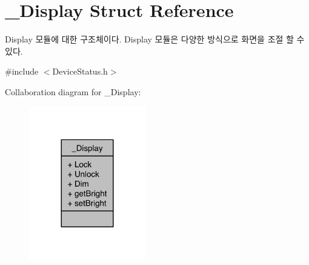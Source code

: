 \hypertarget{struct__Display}{\section{\-\_\-\-Display Struct Reference}
\label{struct__Display}
}


Display 모듈에 대한 구조체이다. Display 모듈은 다양한 방식으로 화면을 조절 할 수 있다.  




{\ttfamily \#include $<$Device\-Status.\-h$>$}



Collaboration diagram for \-\_\-\-Display\-:\nopagebreak
\begin{figure}[H]
\begin{center}
\leavevmode
\includegraphics[width=144pt]{d7/d8b/struct__Display__coll__graph}
\end{center}
\end{figure}
